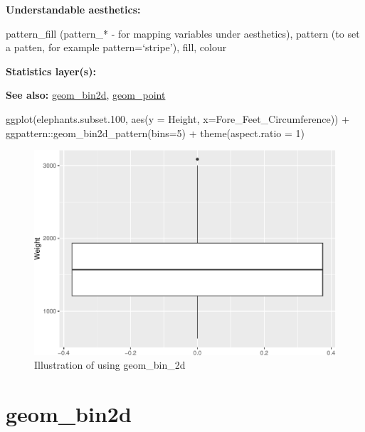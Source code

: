\documentclass[
]{book}
\newenvironment{Shaded}{\begin{snugshade}}{\end{snugshade}}
\newcommand{\AttributeTok}[1]{\textcolor[rgb]{0.77,0.63,0.00}{#1}}
\newcommand{\DecValTok}[1]{\textcolor[rgb]{0.00,0.00,0.81}{#1}}
\newcommand{\FloatTok}[1]{\textcolor[rgb]{0.00,0.00,0.81}{#1}}
\newcommand{\FunctionTok}[1]{\textcolor[rgb]{0.00,0.00,0.00}{#1}}
\newcommand{\NormalTok}[1]{#1}
\newcommand{\SpecialCharTok}[1]{\textcolor[rgb]{0.00,0.00,0.00}{#1}}
\begin{document}
\textbf{Understandable aesthetics: }

pattern\_fill (pattern\_* - for mapping variables under aesthetics), pattern (to set a patten, for example pattern=`stripe'), fill, colour

\textbf{Statistics layer(s): }

\textbf{See also: } \protect\hyperlink{bin2d}{geom\_bin2d}, \protect\hyperlink{point}{geom\_point}

\begin{Shaded}
\begin{Highlighting}[]
\FunctionTok{ggplot}\NormalTok{(elephants.subset}\FloatTok{.100}\NormalTok{, }\FunctionTok{aes}\NormalTok{(}\AttributeTok{y =}\NormalTok{ Height, }\AttributeTok{x=}\NormalTok{Fore\_Feet\_Circumference)) }\SpecialCharTok{+}
\NormalTok{  ggpattern}\SpecialCharTok{::}\FunctionTok{geom\_bin2d\_pattern}\NormalTok{(}\AttributeTok{bins=}\DecValTok{5}\NormalTok{) }\SpecialCharTok{+} 
  \FunctionTok{theme}\NormalTok{(}\AttributeTok{aspect.ratio =} \DecValTok{1}\NormalTok{)}
\end{Highlighting}
\end{Shaded}

\begin{figure}
\centering
\includegraphics{Data-Visualisation-geom-Encyclopedia_files/figure-latex/unnamed-chunk-26-1.pdf}
\caption{\label{fig:unnamed-chunk-26}Illustration of using geom\_bin\_2d}
\end{figure}

\hypertarget{geom_bin2d}{%
\section{geom\_bin2d}\label{geom_bin2d}}
\end{document}
